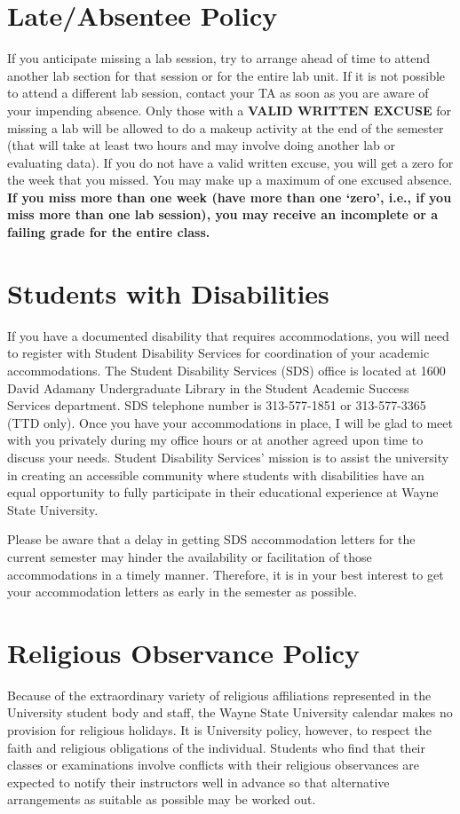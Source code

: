 \section*{Late/Absentee Policy}
If you anticipate missing a lab session, try to arrange ahead of time to attend another lab section for that session or for the entire lab unit.
If it is not possible to attend a different lab session, contact your TA as soon as you are aware of your impending absence.
Only those with a \textbf{VALID WRITTEN EXCUSE} for missing a lab will be allowed to do a makeup activity at the end of the semester (that will take at least two hours and may involve doing another lab or evaluating data).
If you do not have a valid written excuse, you will get a zero for the week that you missed.
You may make up a maximum of one excused absence.
\textbf{If you miss more than one week (have more than one `zero', i.e., if you miss more than one lab session), you may receive an incomplete or a failing grade for the entire class.}

\section*{Students with Disabilities}
If you have a documented disability that requires accommodations, you will need to register with Student Disability Services for coordination of your academic accommodations. 
The Student Disability Services (SDS) office is located at 1600 David Adamany Undergraduate Library in the Student Academic Success Services department. 
SDS telephone number is 313-577-1851 or 313-577-3365 (TTD only). 
Once you have your accommodations in place, I will be glad to meet with you privately during my office hours or at another agreed upon time to discuss your needs. 
Student Disability Services' mission is to assist the university in creating an accessible community where students with disabilities have an equal opportunity to fully participate in their educational experience at Wayne State University.
\par
Please be aware that a delay in getting SDS accommodation letters for the current semester may hinder the availability or facilitation of those accommodations in a timely manner.
Therefore, it is in your best interest to get your accommodation letters as early in the semester as possible.

\section*{Religious Observance Policy}
Because of the extraordinary variety of religious affiliations represented in the University student body and staff, the Wayne State University calendar makes no provision for religious holidays.
It is University policy, however, to respect the faith and religious obligations of the individual.
Students who find that their classes or examinations involve conflicts with their religious observances are expected to notify their instructors well in advance so that alternative arrangements as suitable as possible may be worked out.
